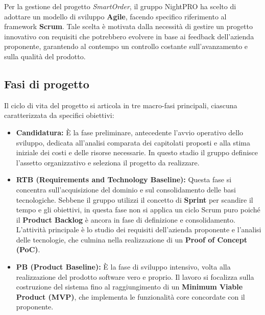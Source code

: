 \documentclass[a4paper, 11pt, oneside]{scrartcl} %
\begin{document}
Per la gestione del progetto \textit{SmartOrder}, il gruppo NightPRO ha scelto di adottare un modello di sviluppo \textbf{Agile}, facendo specifico riferimento al framework{\scriptsize{}} \textbf{Scrum{\scriptsize{}}}.
Tale scelta è motivata dalla necessità di gestire un progetto innovativo con requisiti che potrebbero evolvere in base ai feedback dell'azienda proponente, garantendo al contempo un controllo costante sull'avanzamento e sulla qualità del prodotto.

\subsection{Fasi di progetto}
Il ciclo di vita del progetto si articola in tre macro-fasi principali, ciascuna caratterizzata da specifici obiettivi:
\begin{itemize}
    \item \textbf{Candidatura:} È la fase preliminare, antecedente l'avvio operativo dello sviluppo, dedicata all'analisi comparata dei capitolati proposti e alla stima iniziale dei costi e delle risorse necessarie. In questo stadio il gruppo definisce l'assetto organizzativo e seleziona il progetto da realizzare.

    \item \textbf{RTB (Requirements and Technology Baseline):} Questa fase si concentra sull'acquisizione del dominio e sul consolidamento delle basi tecnologiche. Sebbene il gruppo utilizzi il concetto di \textbf{Sprint}{\scriptsize{}} per scandire il tempo e gli obiettivi, in questa fase non si applica un ciclo Scrum puro poiché il \textbf{Product Backlog}{\scriptsize{}} è ancora in fase di definizione e consolidamento. L'attività principale è lo studio dei requisiti dell'azienda proponente e l'analisi delle tecnologie, che culmina nella realizzazione di un \textbf{Proof of Concept (PoC){\scriptsize{}}}.

    \item \textbf{PB (Product Baseline):} È la fase di sviluppo intensivo, volta alla realizzazione del prodotto software vero e proprio. Il lavoro si focalizza sulla costruzione del sistema fino al raggiungimento di un \textbf{Minimum Viable Product (MVP)}, che implementa le funzionalità core concordate con il proponente.
\end{itemize}
\end{document}
